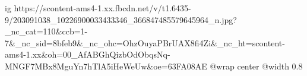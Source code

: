  
 
 
 
 

\ifcmt
  ig https://scontent-ams4-1.xx.fbcdn.net/v/t1.6435-9/203091038_10226900033433346_366847485579645964_n.jpg?_nc_cat=110&ccb=1-7&_nc_sid=8bfeb9&_nc_ohc=OhzOuyaPBrUAX8fi4Zi&_nc_ht=scontent-ams4-1.xx&oh=00_AfABGhQizbOdObqsNq-MNGF7MBx8MguYn7hTlA5iHeWeUw&oe=63FA08AE
  @wrap center
  @width 0.8
\fi
